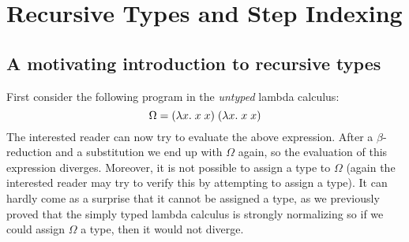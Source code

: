 \section*{Recursive Types and Step Indexing}
\subsection*{A motivating introduction to recursive types}
First consider the  following program in the \emph{untyped} lambda calculus:
\[
  \Omega = (\lambda x . \; x \; x) \; (\lambda x . \; x \; x)
\]
The interested reader can now try to evaluate the above expression. After a $\beta$-reduction and a substitution we end up with $\Omega$ again, so the evaluation of this expression diverges. Moreover, it is not possible to assign a type to $\Omega$ (again the interested reader may try to verify this by attempting to assign a type). It can hardly come as a surprise that it cannot be assigned a type, as we previously proved that the simply typed lambda calculus is strongly normalizing so if we could assign $\Omega$ a type, then it would not diverge.

